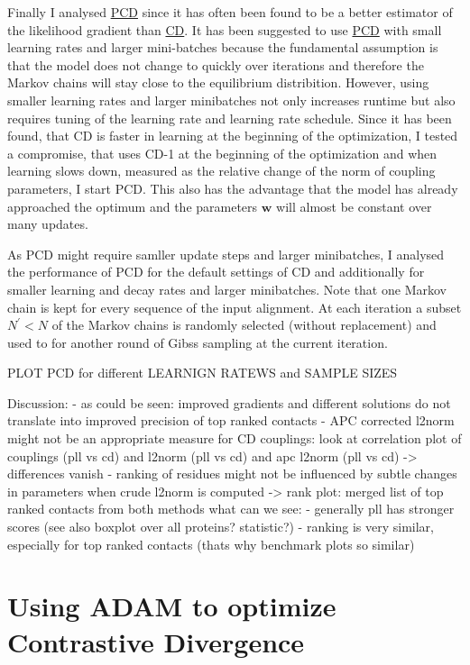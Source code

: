 \documentclass[11pt,a4paper,twoside]{book}
\newcommand{\w}{\mathbf{w}}
\theoremstyle{definition}
\theoremstyle{definition}
\theoremstyle{remark}
\begin{document}
Finally I analysed \protect\hyperlink{abbrev}{PCD} since it has often
been found to be a better estimator of the likelihood gradient than
\protect\hyperlink{abbrev}{CD}. It has been suggested to use
\protect\hyperlink{abbrev}{PCD} with small learning rates and larger
mini-batches because the fundamental assumption is that the model does
not change to quickly over iterations and therefore the Markov chains
will stay close to the equilibrium distribition. However, using smaller
learning rates and larger minibatches not only increases runtime but
also requires tuning of the learning rate and learning rate schedule.
Since it has been found, that CD is faster in learning at the beginning
of the optimization, I tested a compromise, that uses CD-1 at the
beginning of the optimization and when learning slows down, measured as
the relative change of the norm of coupling parameters, I start PCD.
This also has the advantage that the model has already approached the
optimum and the parameters \(\w\) will almost be constant over many
updates.

As PCD might require samller update steps and larger minibatches, I
analysed the performance of PCD for the default settings of CD and
additionally for smaller learning and decay rates and larger
minibatches. Note that one Markov chain is kept for every sequence of
the input alignment. At each iteration a subset \(N^{\prime} < N\) of
the Markov chains is randomly selected (without replacement) and used to
for another round of Gibss sampling at the current iteration.

PLOT PCD for different LEARNIGN RATEWS and SAMPLE SIZES

Discussion: - as could be seen: improved gradients and different
solutions do not translate into improved precision of top ranked
contacts - APC corrected l2norm might not be an appropriate measure for
CD couplings: look at correlation plot of couplings (pll vs cd) and
l2norm (pll vs cd) and apc l2norm (pll vs cd) -\textgreater{}
differences vanish - ranking of residues might not be influenced by
subtle changes in parameters when crude l2norm is computed
-\textgreater{} rank plot: merged list of top ranked contacts from both
methods what can we see: - generally pll has stronger scores (see also
boxplot over all proteins? statistic?) - ranking is very similar,
especially for top ranked contacts (thats why benchmark plots so
similar)

\section{Using ADAM to optimize Contrastive
Divergence}\label{adam-results}
\end{document}
